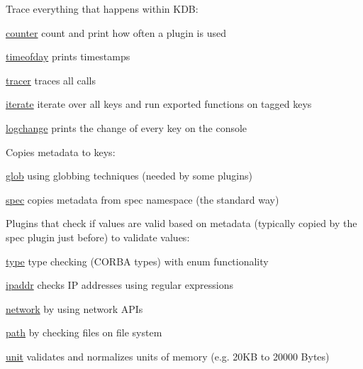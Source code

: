 Trace everything that happens within K\+DB\+:


\begin{DoxyItemize}
\item \hyperlink{autotoc_md104_src_plugins_counter_README_md}{counter} count and print how often a plugin is used
\item \hyperlink{autotoc_md639_src_plugins_timeofday_README_md}{timeofday} prints timestamps
\item \hyperlink{autotoc_md749_src_plugins_tracer_README_md}{tracer} traces all calls
\item \hyperlink{autotoc_md308_src_plugins_iterate_README_md}{iterate} iterate over all keys and run exported functions on tagged keys
\item \hyperlink{autotoc_md362_src_plugins_logchange_README_md}{logchange} prints the change of every key on the console
\end{DoxyItemize}

Copies metadata to keys\+:


\begin{DoxyItemize}
\item \hyperlink{autotoc_md239_src_plugins_glob_README_md}{glob} using globbing techniques (needed by some plugins)
\item \hyperlink{autotoc_md612_src_plugins_spec_README_md}{spec} copies metadata from spec namespace (the standard way)
\end{DoxyItemize}

Plugins that check if values are valid based on metadata (typically copied by the {\ttfamily spec} plugin just before) to validate values\+:


\begin{DoxyItemize}
\item \hyperlink{autotoc_md752_src_plugins_type_README_md}{type} type checking (C\+O\+R\+BA types) with enum functionality
\item \hyperlink{autotoc_md291_src_plugins_ipaddr_README_md}{ipaddr} checks IP addresses using regular expressions
\item \hyperlink{autotoc_md459_src_plugins_network_README_md}{network} by using network A\+P\+Is
\item \hyperlink{autotoc_md492_src_plugins_path_README_md}{path} by checking files on file system
\item \hyperlink{autotoc_md763_src_plugins_unit_README_md}{unit} validates and normalizes units of memory (e.\+g. 20\+KB to 20000 Bytes)
\end{DoxyItemize}

